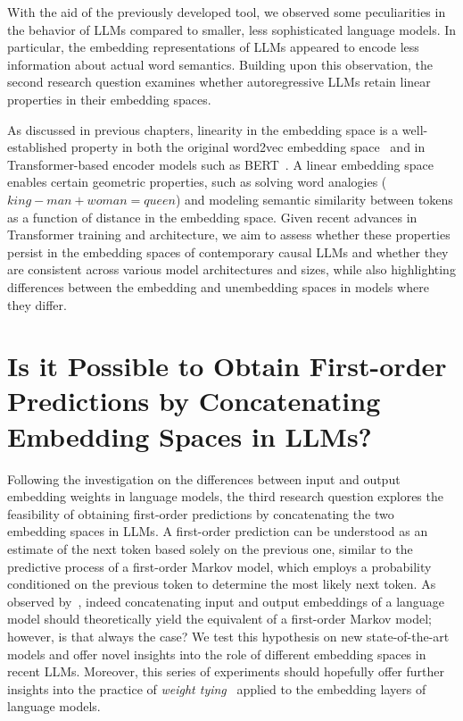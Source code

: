 With the aid of the previously developed tool, we observed some peculiarities in the behavior of LLMs compared to smaller, less sophisticated language models.
In particular, the embedding representations of LLMs appeared to encode less information about actual word semantics.
Building upon this observation, the second research question examines whether autoregressive LLMs retain linear properties in their embedding spaces.

As discussed in previous chapters, linearity in the embedding space is a well-established property in both the original word2vec embedding space~\cite{mikolov2013} and in Transformer-based encoder models such as BERT~\cite{devlin2019}.
A linear embedding space enables certain geometric properties, such as solving word analogies ($king - man + woman = queen$) and modeling semantic similarity between tokens as a function of distance in the embedding space.
Given recent advances in Transformer training and architecture, we aim to assess whether these properties persist in the embedding spaces of contemporary causal LLMs and whether they are consistent across various model architectures and sizes, while also highlighting differences between the embedding and unembedding spaces in models where they differ.

\section[Is it Possible to Obtain First-order Predictions by Concatenating Embedding Spaces in LLMs?]{Is it Possible to Obtain First-order \texorpdfstring{ \\ }{} \mbox{Predictions} by \mbox{Concatenating} \texorpdfstring{ \\ }{} Embedding Spaces in LLMs?}\label{sec:rq_fom}

Following the investigation on the differences between input and output embedding weights in language models, the third research question explores the feasibility of obtaining first-order predictions by concatenating the two embedding spaces in LLMs.
A first-order prediction can be understood as an estimate of the next token based solely on the previous one, similar to the predictive process of a first-order Markov model, which employs a probability conditioned on the previous token to determine the most likely next token.
As observed by~\citet{elhage2021}, indeed concatenating input and output embeddings of a language model should theoretically yield the equivalent of a first-order Markov model; however, is that always the case?
We test this hypothesis on new state-of-the-art models and offer novel insights into the role of different embedding spaces in recent LLMs.
Moreover, this series of experiments should hopefully offer further insights into the practice of \emph{weight tying}~\cite{inan2017,press2017} applied to the embedding layers of language models.
